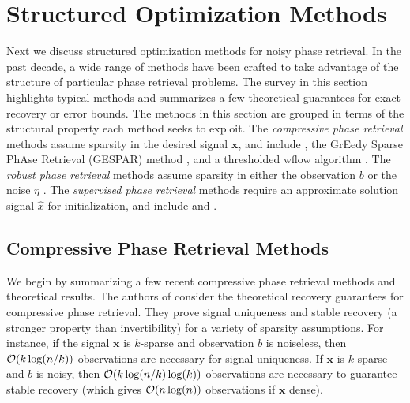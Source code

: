 \section{Structured Optimization Methods}  	\label{Subsubsec:phase_retrieval-structured}


Next we discuss structured optimization methods for noisy phase retrieval.  In the past decade, a wide range of methods have been crafted to take advantage of the structure of particular phase retrieval problems.  The survey in this section highlights typical methods and summarizes a few theoretical guarantees for exact recovery or error bounds.  
The methods in this section are grouped in terms of the structural property each method seeks to exploit.  
The \textit{compressive phase retrieval} methods assume sparsity in the desired signal $\mathbf{x}$, and include \cite{DBLP:journals/corr/abs-1104-4406}, the GrEedy Sparse PhAse Retrieval (GESPAR) method \cite{shechtman2014gespar}, and a thresholded wflow algorithm \cite{cai2016optimal}.
The \textit{robust phase retrieval} methods assume sparsity in either the observation $b$ \cite{katkovnik2017phase} or the noise $\eta$ \cite{jiang2017robust}.
The \textit{supervised phase retrieval} methods require an approximate solution signal $\hat{x}$ for initialization, and include \cite{goldstein2018phasemax} and \cite{bahmani2016phase}.




\subsection{Compressive Phase Retrieval Methods}

We begin by summarizing a few recent compressive phase retrieval methods and theoretical results.
The authors of \cite{DBLP:journals/corr/abs-1211-0872} consider the theoretical recovery guarantees for compressive phase retrieval.
They prove signal uniqueness and stable recovery (a stronger property than invertibility) for a variety of sparsity assumptions.  
For instance, if the signal $\mathbf{x}$ is $k$-sparse and observation $b$ is noiseless, then ${\mathcal O}(k \log(n/k))$ observations are necessary for signal uniqueness.  
If $\mathbf{x}$ is $k$-sparse and $b$ is noisy, then ${\mathcal O}(k \log(n/k) \log(k))$ observations are necessary to guarantee stable recovery (which gives ${\mathcal O}(n \log(n))$ observations if $\mathbf{x}$ dense).


